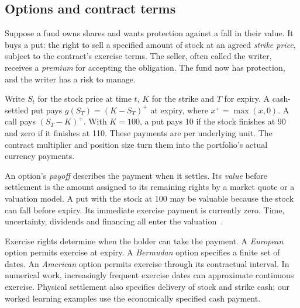 \documentclass[8pt]{strategynet-journal}
\begin{document}
\begin{SNcolumns}

\section{Options and contract terms}
Suppose a fund owns shares and wants protection against a fall in their value.
It buys a put: the right to sell a specified amount of stock at an agreed
\emph{strike price}, subject to the contract's exercise terms. The seller,
often called the writer, receives a \emph{premium} for accepting the obligation.
The fund now has protection, and the writer has a risk to manage.

Write $S_t$ for the stock price at time $t$, $K$ for the strike and $T$ for
expiry. A cash-settled put pays $g(S_T)=(K-S_T)^+$ at expiry, where
$x^+=\max(x,0)$. A call pays $(S_T-K)^+$. With $K=100$, a put pays 10 if
the stock finishes at 90 and zero if it finishes at 110. These payments are
per underlying unit. The contract multiplier and position size turn them
into the portfolio's actual currency payments.

An option's \emph{payoff} describes the payment when it settles. Its
\emph{value} before settlement is the amount assigned to its remaining rights
by a market quote or a valuation model. A put with the stock at 100 may be
valuable because the stock can fall before expiry. Its immediate exercise
payment is currently zero. Time, uncertainty, dividends and financing all
enter the valuation~\cite{oicpricing}.

\begin{center}\begin{minipage}{\linewidth}\centering
{}
\end{minipage}\end{center}

Exercise rights determine when the holder can take the payment. A
\emph{European} option permits exercise at expiry. A \emph{Bermudan} option
specifies a finite set of dates. An \emph{American} option permits exercise
through its contractual interval. In numerical work, increasingly frequent
exercise dates can approximate continuous exercise. Physical settlement
also specifies delivery of stock and strike cash; our worked learning
examples use the economically specified cash payment.


\end{SNcolumns}
\end{document}
